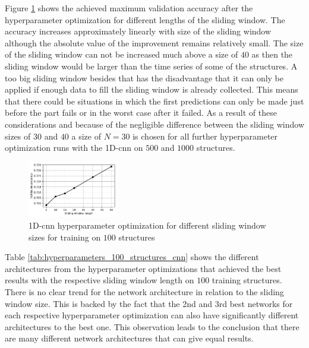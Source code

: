 \documentclass[conference]{IEEEtran}
\begin{document}
Figure \ref{fig:influence_sequence_length_cnn} shows the achieved maximum validation accuracy after the hyperparameter optimization for different lengths of the sliding window. The accuracy increases approximately linearly with size of the sliding window although the absolute value of the improvement remains relatively small. The size of the sliding window can not be increased much above a size of $ 40 $ as then the sliding window would be larger than the time series of some of the structures. A too big sliding window besides that has the disadvantage that it can only be applied if enough data to fill the sliding window is already collected. This means that there could be situations in which the first predictions can only be made just before the part fails or in the worst case after it failed. As a result of these considerations and because of the negligible difference between the sliding window sizes of $ 30 $ and $ 40 $ a size of $ N = 30 $ is chosen for all further hyperparameter optimization runs with the 1D-\gls{cnn} on $ 500 $ and $ 1000 $ structures.

\begin{figure}[htp]
	\centering
	\includegraphics[width=0.35\textwidth]{python/influence_sequence_length_cnn.pdf}
	\caption{1D-\gls{cnn} hyperparameter optimization for different sliding window sizes for training on $ 100 $ structures}
	\label{fig:influence_sequence_length_cnn}
\end{figure}

Table \ref{tab:hyperparameters_100_structures_cnn} shows the different architectures from the hyperparameter optimizations that achieved the best results with the respective sliding window length on $ 100 $ training structures. There is no clear trend for the network architecture in relation to the sliding window size. This is backed by the fact that the 2nd and 3rd best networks for each respective hyperparameter optimization can also have significantly different architectures to the best one. This observation leads to the conclusion that there are many different network architectures that can give equal results.
\end{document}
